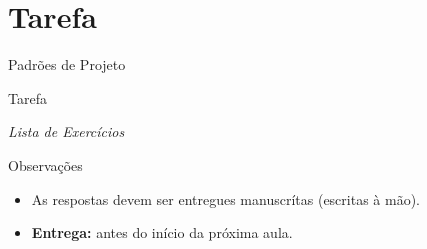 \documentclass[
	9pt, %
	t, %
]{beamer}
\begin{document}

\section{Tarefa}

\begin{frame}
	\begin{center}

		\bigskip\bigskip\bigskip\bigskip %
		{\Large Padrões de Projeto}

		\bigskip\bigskip %
		{\Huge Tarefa}

		\smallskip
		{\small \textit{Lista de Exercícios}}

		\bigskip\bigskip
		\begin{block}{Observações}
			\begin{itemize}
				\item As respostas devem ser entregues manuscrítas (escritas à mão).
				\item \textbf{Entrega:} antes do início da próxima aula.
			\end{itemize}
		\end{block}
	\end{center}

\end{frame}
\end{document}
